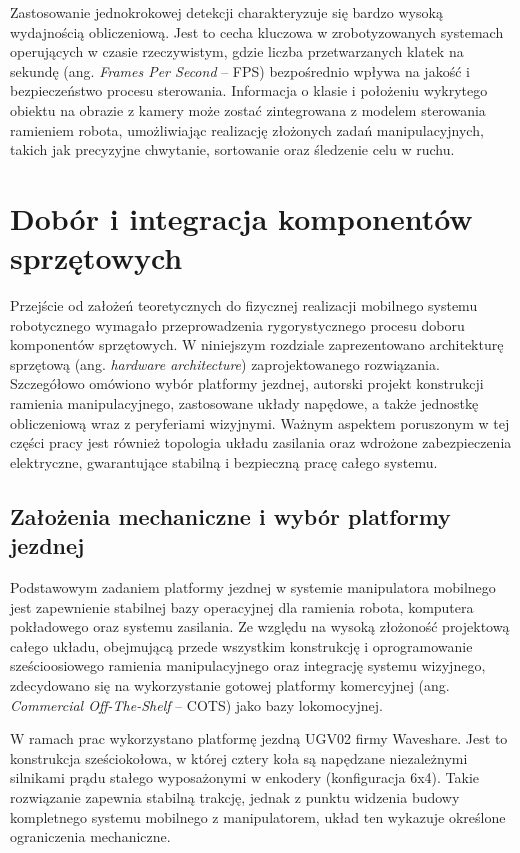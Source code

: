 \documentclass[11pt]{extreport}
\begin{document}
Zastosowanie jednokrokowej detekcji charakteryzuje się bardzo wysoką wydajnością obliczeniową. Jest to cecha kluczowa w zrobotyzowanych systemach operujących w czasie rzeczywistym, gdzie liczba przetwarzanych klatek na sekundę (ang. \textit{Frames Per Second} -- FPS) bezpośrednio wpływa na jakość i bezpieczeństwo procesu sterowania. Informacja o klasie i położeniu wykrytego obiektu na obrazie z kamery może zostać zintegrowana z modelem sterowania ramieniem robota, umożliwiając realizację złożonych zadań manipulacyjnych, takich jak precyzyjne chwytanie, sortowanie oraz śledzenie celu w ruchu.


\chapter{Dobór i integracja komponentów sprzętowych}

Przejście od założeń teoretycznych do fizycznej realizacji mobilnego systemu robotycznego wymagało przeprowadzenia rygorystycznego procesu doboru komponentów sprzętowych. W niniejszym rozdziale zaprezentowano architekturę sprzętową (ang. \textit{hardware architecture}) zaprojektowanego rozwiązania. Szczegółowo omówiono wybór platformy jezdnej, autorski projekt konstrukcji ramienia manipulacyjnego, zastosowane układy napędowe, a także jednostkę obliczeniową wraz z peryferiami wizyjnymi. Ważnym aspektem poruszonym w tej części pracy jest również topologia układu zasilania oraz wdrożone zabezpieczenia elektryczne, gwarantujące stabilną i bezpieczną pracę całego systemu.

\section{Założenia mechaniczne i wybór platformy jezdnej}

Podstawowym zadaniem platformy jezdnej w systemie manipulatora mobilnego jest zapewnienie stabilnej bazy operacyjnej dla ramienia robota, komputera pokładowego oraz systemu zasilania. Ze względu na wysoką złożoność projektową całego układu, obejmującą przede wszystkim konstrukcję i oprogramowanie sześcioosiowego ramienia manipulacyjnego oraz integrację systemu wizyjnego, zdecydowano się na wykorzystanie gotowej platformy komercyjnej (ang. \textit{Commercial Off-The-Shelf} -- COTS) jako bazy lokomocyjnej.

W ramach prac wykorzystano platformę jezdną UGV02 firmy Waveshare. Jest to konstrukcja sześciokołowa, w której cztery koła są napędzane niezależnymi silnikami prądu stałego wyposażonymi w enkodery (konfiguracja 6x4). Takie rozwiązanie zapewnia stabilną trakcję, jednak z punktu widzenia budowy kompletnego systemu mobilnego z manipulatorem, układ ten wykazuje określone ograniczenia mechaniczne.
\end{document}
